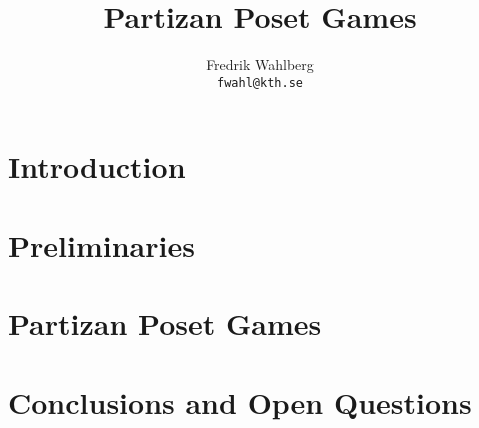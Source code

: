 \documentclass[a4paper]{article}
\begin{document}
\title{Partizan Poset Games}
\author{Fredrik Wahlberg\\
\texttt{fwahl@kth.se}
}





\newpage

\tableofcontents


\newpage

\section{Introduction}


\newpage
\section{Preliminaries}


\newpage

\section{Partizan Poset Games}

\newpage
\section{Conclusions and Open Questions}

\newpage


\newpage

%
\end{document}
